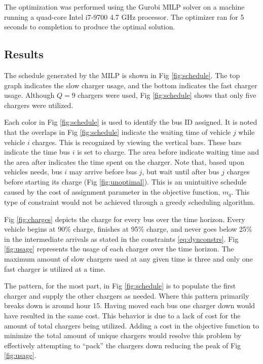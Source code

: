 \documentclass[letterpaper, 10pt, conference]{IEEEtran}
\begin{document}
The optimization was performed using the Gurobi MILP solver \cite{Hespanha2018} on a machine running a quad-core Intel
i7-9700 4.7 GHz processor. The optimizer ran for 5 seconds to completion to produce the optimal solution.

\subsection{Results}
The schedule generated by the MILP is shown in Fig \ref{fig:schedule}. The top graph indicates the slow charger usage,
and the bottom indicates the fast charger usage. Although $Q = 9$ chargers were used, Fig \ref{fig:schedule} shows that
only five chargers were utilized.

Each color in Fig \ref{fig:schedule} is used to identify the bus ID assigned. It is noted that the overlaps in Fig
\ref{fig:schedule} indicate the waiting time of vehicle $j$ while vehicle $i$ charges. This is recognized by viewing the
vertical bars. These bars indicate the time bus $i$ is set to charge. The area before indicate waiting time and the area
after indicates the time spent on the charger. Note that, based upon vehicles needs, bus $i$ may arrive before bus $j$,
but wait until after bus $j$ charges before starting its charge (Fig \ref{fig:unoptimal}). This is an unintuitive
schedule caused by the cost of assignment parameter in the objective function, $m_q$. This type of constraint would not
be achieved through a greedy scheduling algorithm.

Fig \ref{fig:charges} depicts the charge for every bus over the time horizon. Every vehicle begins at 90\% charge,
finishes at 95\% charge, and never goes below 25\% in the intermediate arrivals as stated in the constraints
\eqref{eq:dynconstrs}. Fig \ref{fig:usage} represents the usage of each charger over the time horizon. The maximum
amount of slow chargers used at any given time is three and only one fast charger is utilized at a time. 

The pattern, for the most part, in Fig \ref{fig:schedule} is to populate the first charger and supply the other chargers as needed. Where this pattern primarily breaks down is around hour 15. Having moved each bus one charger down would have resulted in the same cost. This behavior is due to a lack of cost for the amount of total chargers being utilized. Adding a cost in the objective function to minimize the total amount of unique chargers would resolve this problem by effectively attempting to ``pack'' the chargers down reducing the peak of Fig \ref{fig:usage}. 
\end{document}

